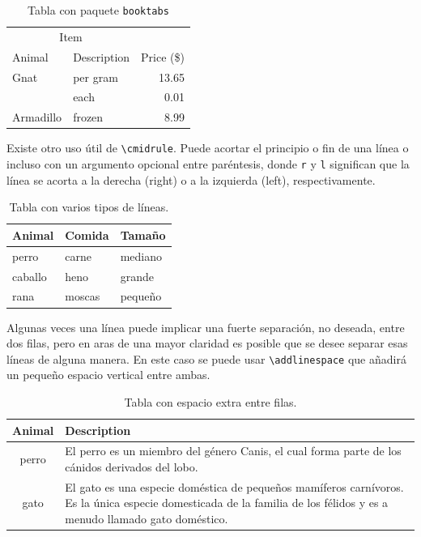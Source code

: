 \documentclass[11pt,a4paper]{article}
\begin{document}
\begin{table}[H]
   \centering
   	  \caption{Tabla con paquete \texttt{booktabs}}
   	  \label{tab:booktabs}      
   	  \begin{tabular}{llr}
      \toprule
      \multicolumn{2}{c}{Item} \\
      \cmidrule(r){1-2}
      Animal & Description & Price (\$) \\
      \midrule
      Gnat  & per gram & 13.65 \\
            & each     &  0.01 \\
      Armadillo & frozen & 8.99 \\
      \bottomrule
      \end{tabular}
\end{table}

Existe otro uso útil de \texttt{\textbackslash cmidrule}. Puede acortar el principio o fin de una línea o incluso con un argumento opcional entre paréntesis, donde \texttt{r} y \texttt{l} significan que la línea se acorta a la derecha (right) o a la izquierda (left), respectivamente.

\begin{table}[H]
   \centering
   	  \caption{Tabla con varios tipos de líneas.}
   	  \label{tab:cmidrule}      
    \begin{tabular}{lll}
      \toprule
      Animal  & Comida & Tamaño  \\
      \midrule
      perro   & carne  & mediano \\
      \cmidrule{1-2}
      caballo & heno   & grande  \\
      \cmidrule(r){1-1}
      \cmidrule(rl){2-2}
      \cmidrule(l){3-3}
      rana    & moscas & pequeño \\
      \bottomrule
    \end{tabular}
\end{table}

Algunas veces una línea puede implicar una fuerte separación, no deseada, entre dos filas, pero en aras de una mayor claridad es posible que se desee separar esas líneas de alguna manera. En este caso se puede usar \texttt{\textbackslash addlinespace} que añadirá un pequeño espacio vertical entre ambas.

\begin{table}[H]
   \centering
   	  \caption{Tabla con espacio extra entre filas.}
   	  \label{tab:espace}      
    \begin{tabular}{cp{9cm}}
      \toprule
      Animal & Description \\
      \midrule
      perro  & El perro es un miembro del género Canis, el cual forma parte 
               de los cánidos derivados del lobo. \\
      \addlinespace
      gato   & El gato es una especie doméstica de pequeños mamíferos carnívoros. Es la 
               única especie domesticada de la familia de los félidos y es a menudo llamado 
    		   gato doméstico. \\
      \bottomrule
    \end{tabular}
\end{table}
\end{document}
